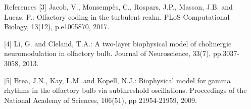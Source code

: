 \documentclass[final,hyperref={pdfpagelabels=false}]{beamer}
\begin{document}
\begin{frame}{}
\begin{columns}[t]
\begin{column}{.48\linewidth}
\begin{block}{References}
\tiny{[3] Jacob, V., Monsempès, C., Rospars, J.P., Masson, J.B. and Lucas, P.: Olfactory coding in the turbulent realm. PLoS Computational Biology, 13(12), p.e1005870, 2017.}

\tiny{[4] Li, G. and Cleland, T.A.: A two-layer biophysical model of cholinergic neuromodulation in olfactory bulb. Journal of Neuroscience, 33(7), pp.3037-3058, 2013.}

\tiny{[5] Brea, J.N., Kay, L.M. and Kopell, N.J.: Biophysical model for gamma rhythms in the olfactory bulb via subthreshold oscillations. Proceedings of the National Academy of Sciences, 106(51), pp 21954-21959, 2009.}
\end{block}

\end{column}
\begin{column}{.48\linewidth}


\end{column}
\end{columns}
\end{frame}
\end{document}
